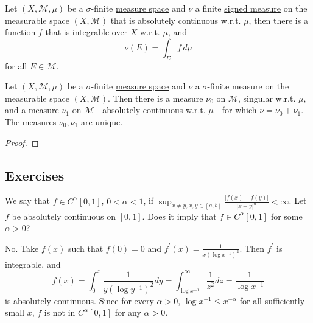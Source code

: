   \begin{corollary}
    \label{thm:lebesgue-decomposition-for-a-finite-signed}
    Let $(X, \mathcal{M}, \mu)$ be a $\sigma$-finite \hyperref[def:measure-space]{measure space} and $\nu$ a finite \hyperref[def:signed-measure]{signed measure} on the measurable space $(X, \mathcal{M})$ that is absolutely continuous w.r.t. $\mu$, then there is a function $f$ that is integrable over $X$ w.r.t. $\mu$, and 
    \begin{equation}
      \nu (E) = \int_E f \, d\mu 
    \end{equation}
    for all $E \in \mathcal{M}$. 
  \end{corollary}

  \begin{theorem}
    \label{thm:lebesgue-decomposition-theorem}
    Let $(X, \mathcal{M}, \mu)$ be a $\sigma$-finite \hyperref[def:measure-space]{measure space} and $\nu$ a $\sigma$-finite measure on the measurable space $(X, \mathcal{M})$. Then there is a measure $\nu_0$ on $\mathcal{M}$, singular w.r.t. $\mu$, and a measure $\nu_1$ on $\mathcal{M}$---absolutely continuous w.r.t. $\mu$---for which $\nu = \nu_0 + \nu_1$. The measures $\nu_0, \nu_1$ are unique. 
  \end{theorem}
  \begin{proof}
    
  \end{proof}

\subsection{Exercises} 

  \begin{exercise}
    We say that $f\in C^{\alpha}[0,1]$, $0<\alpha<1$, if $\sup_{x\ne y,x,y\in[a,b]}\frac{|f(x)-f(y)|}{|x-y|^{\alpha}}<\infty$. Let $f$ be absolutely continuous on $[0, 1]$. Does it imply that $f\in C^{\alpha}[0,1]$ for some $\alpha>0$?
  \end{exercise}
  \begin{solution}
    No. Take $f(x)$ such that $f(0)=0$ and $f^{\prime}(x)=\frac{1}{x(\log x^{-1})^{2}}$. Then $f^{\prime}$ is integrable, and
    \begin{equation}
      f(x)=\int_{0}^{x}\frac{1}{y(\log y^{-1})^{2}}dy=\int_{\log x^{-1}}^{\infty}\frac{1}{z^{2}}dz=\frac{1}{\log x^{-1}}
    \end{equation}
    is absolutely continuous. Since for every $\alpha>0$, $\log x^{-1}\le x^{-\alpha}$ for all sufficiently small $x$, $f$ is not in $C^{\alpha}[0,1]$ for any $\alpha>0$.
  \end{solution}

